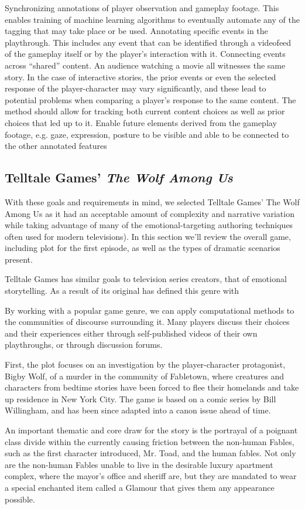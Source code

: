 Synchronizing annotations of player observation and gameplay
footage. This enables training of machine learning algorithms to
eventually automate any of the tagging that may take place or be used.
Annotating specific events in the playthrough. This includes any event
that can be identified through a videofeed of the gameplay itself or
by the player’s interaction with it.  Connecting events across
“shared” content. An audience watching a movie all witnesses the same
story. In the case of interactive stories, the prior events or even
the selected response of the player-character may vary significantly,
and these lead to potential problems when comparing a player’s
response to the same content. The method should allow for tracking
both current content choices as well as prior choices that led up to
it.  Enable future elements derived from the gameplay footage,
e.g. gaze, expression, posture to be visible and able to be connected
to the other annotated features
\subsection{Telltale Games’ \emph{The Wolf Among Us}}
\label{sec:orgheadline8}
With these goals and requirements in mind, we selected Telltale Games’
The Wolf Among Us as it had an acceptable amount of complexity and
narrative variation while taking advantage of many of the
emotional-targeting authoring techniques often used for modern
televisions). In this section we’ll review the overall game, including
plot for the first episode, as well as the types of dramatic scenarios
present.

Telltale Games has similar goals to television series creators, that
of emotional storytelling. As a result of its original has defined
this genre with

By working with a popular game genre, we can apply computational
methods to the communities of discourse surrounding it. Many players
discuss their choices and their experiences either through
self-published videos of their own playthroughs, or through discussion
forums.

First, the plot focuses on an investigation by the player-character
protagonist, Bigby Wolf, of a murder in the community of Fabletown,
where creatures and characters from bedtime stories have been forced
to flee their homelands and take up residence in New York City. The
game is based on a comic series by Bill Willingham, and has been since
adapted into a canon issue ahead of time.

An important thematic and core draw for the story is the portrayal of
a poignant class divide within the currently causing friction between
the non-human Fables, such as the first character introduced,
Mr. Toad, and the human fables. Not only are the non-human Fables
unable to live in the desirable luxury apartment complex, where the
mayor’s office and sheriff are, but they are mandated to wear a
special enchanted item called a Glamour that gives them any appearance
possible.

